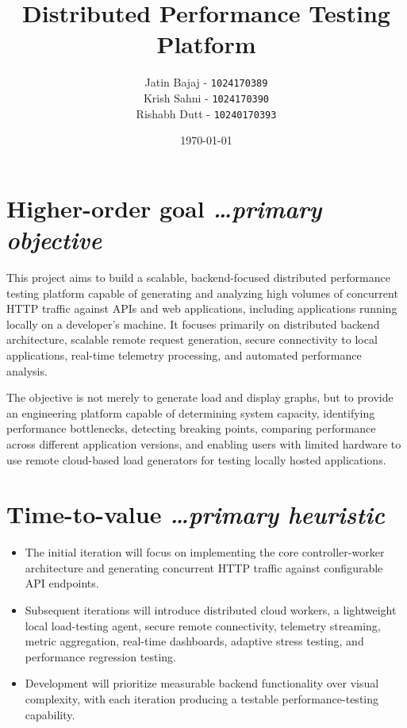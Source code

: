 \documentclass[11pt,a4paper]{article}
\title{Distributed Performance Testing Platform}
\author{
  Jatin Bajaj - \texttt{1024170389} \\[0.3em]
  Krish Sahni - \texttt{1024170390} \\[0.3em]
  Rishabh Dutt - \texttt{10240170393}
}
\date{\today}
\newcommand{\BvrHint}[1]{%
  {\normalfont\normalsize\itshape\hfill #1}}
\begin{document}
\maketitle

\section{Higher-order goal%
  \BvrHint{\ldots primary objective}}

This project aims to build a scalable, backend-focused distributed
performance testing platform capable of generating and analyzing
high volumes of concurrent HTTP traffic against APIs and web
applications, including applications running locally on a developer's
machine. It focuses primarily on distributed backend architecture,
scalable remote request generation, secure connectivity to local
applications, real-time telemetry processing, and automated
performance analysis.

The objective is not merely to generate load and display graphs, but
to provide an engineering platform capable of determining system
capacity, identifying performance bottlenecks, detecting breaking
points, comparing performance across different application versions,
and enabling users with limited hardware to use remote cloud-based
load generators for testing locally hosted applications.

\section{Time-to-value%
  \BvrHint{\ldots primary heuristic}}

\begin{itemize}[leftmargin=0.7cm]

    \item The initial iteration will focus on implementing the core
    controller-worker architecture and generating concurrent HTTP
    traffic against configurable API endpoints.

    \item Subsequent iterations will introduce distributed cloud
    workers, a lightweight local load-testing agent, secure remote
    connectivity, telemetry streaming, metric aggregation,
    real-time dashboards, adaptive stress testing, and performance
    regression testing.

    \item Development will prioritize measurable backend functionality
    over visual complexity, with each iteration producing a testable
    performance-testing capability.

\end{itemize}
\end{document}
